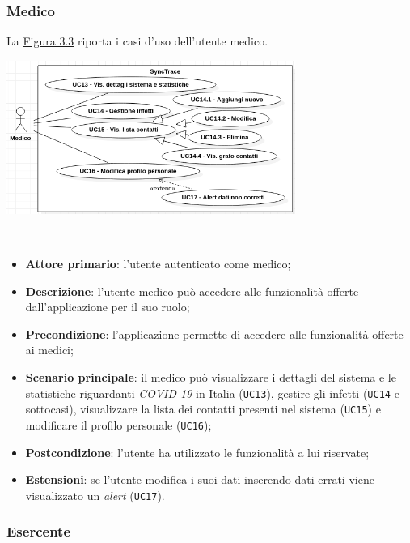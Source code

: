 \subsubsection*{Medico}

La \hyperref[img:medico]{Figura 3.3} riporta i casi d'uso dell'utente medico.

\begin{minipage}{\linewidth}
  \label{img:medico}
  \centering
    \includegraphics[height=5cm]{immagini/uc/medico}
\end{minipage} \\

\begin{itemize}
  \item \textbf{Attore primario}: l'utente autenticato come medico;
  \item \textbf{Descrizione}: l'utente medico può accedere alle funzionalità offerte dall'applicazione per il suo ruolo;
  \item \textbf{Precondizione}: l'applicazione permette di accedere alle funzionalità offerte ai medici;
  \item \textbf{Scenario principale}: il medico può visualizzare i dettagli del sistema e le statistiche riguardanti \textit{COVID-19} in Italia (\texttt{UC13}), gestire gli infetti (\texttt{UC14} e sottocasi), visualizzare la lista dei contatti presenti nel sistema (\texttt{UC15}) e modificare il profilo personale (\texttt{UC16});
  \item \textbf{Postcondizione}: l'utente ha utilizzato le funzionalità a lui riservate;
  \item \textbf{Estensioni}: se l'utente modifica i suoi dati inserendo dati errati viene visualizzato un \textit{alert} (\texttt{UC17}).
\end{itemize}

\subsubsection*{Esercente}

